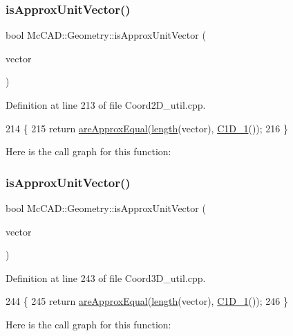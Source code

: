 \subsubsection{\texorpdfstring{is\+Approx\+Unit\+Vector()}{isApproxUnitVector()}\hspace{0.1cm}{\footnotesize\ttfamily [1/2]}}
{\footnotesize\ttfamily bool Mc\+C\+A\+D\+::\+Geometry\+::is\+Approx\+Unit\+Vector (\begin{DoxyParamCaption}\item[{const \hyperlink{classMcCAD_1_1Geometry_1_1Coord2D}{Coord2D} \&}]{vector }\end{DoxyParamCaption})}



Definition at line 213 of file Coord2\+D\+\_\+util.\+cpp.


\begin{DoxyCode}
214                               \{
215     \textcolor{keywordflow}{return} \hyperlink{namespaceMcCAD_1_1Geometry_acad920c663ce775977ff6dc46b1030af}{areApproxEqual}(\hyperlink{namespaceMcCAD_1_1Geometry_ad2997914c766f1fc561cdd30032b6777}{length}(vector), \hyperlink{namespaceMcCAD_1_1Geometry_ad7994c2ae088570476d26d338aa22cff}{C1D\_1}());
216 \}
\end{DoxyCode}
Here is the call graph for this function\+:
\mbox{\label{namespaceMcCAD_1_1Geometry_a645532f9f054fcbae341c5a3e6ca2fd2}} 
\subsubsection{\texorpdfstring{is\+Approx\+Unit\+Vector()}{isApproxUnitVector()}\hspace{0.1cm}{\footnotesize\ttfamily [2/2]}}
{\footnotesize\ttfamily bool Mc\+C\+A\+D\+::\+Geometry\+::is\+Approx\+Unit\+Vector (\begin{DoxyParamCaption}\item[{const \hyperlink{classMcCAD_1_1Geometry_1_1Coord3D}{Coord3D} \&}]{vector }\end{DoxyParamCaption})}



Definition at line 243 of file Coord3\+D\+\_\+util.\+cpp.


\begin{DoxyCode}
244                               \{
245     \textcolor{keywordflow}{return} \hyperlink{namespaceMcCAD_1_1Geometry_acad920c663ce775977ff6dc46b1030af}{areApproxEqual}(\hyperlink{namespaceMcCAD_1_1Geometry_ad2997914c766f1fc561cdd30032b6777}{length}(vector), \hyperlink{namespaceMcCAD_1_1Geometry_ad7994c2ae088570476d26d338aa22cff}{C1D\_1}());
246 \}
\end{DoxyCode}
Here is the call graph for this function\+:
\mbox{\label{namespaceMcCAD_1_1Geometry_ab200fce18c184178d2ec77747d51c32a}} 
